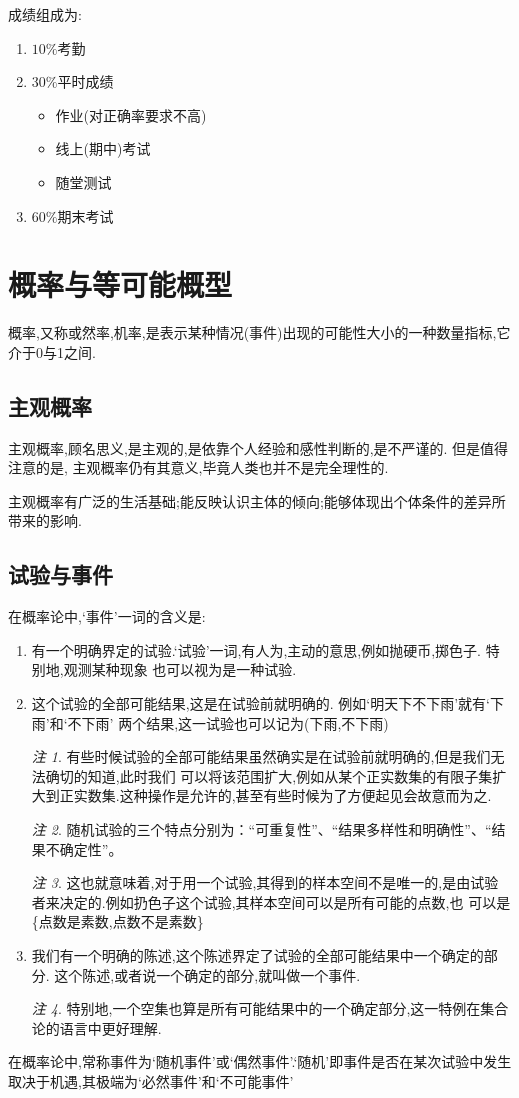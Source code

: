 \documentclass[a4paper,11pt]{article}%
\theoremstyle{remark}
\newtheorem*{remark}{注}
\theoremstyle{remark}
\theoremstyle{definition}
\theoremstyle{definition}
\theoremstyle{plain}
\begin{document}
\newpage
成绩组成为:
\begin{enumerate}
    \item$10\%$考勤
    \item$30\%$平时成绩 
    \begin{itemize}
        \item 作业(对正确率要求不高)
        \item 线上(期中)考试
        \item 随堂测试
    \end{itemize}
    \item$60\%$期末考试
\end{enumerate}
\newpage
\section{概率与等可能概型}
概率,又称或然率,机率,是表示某种情况(事件)出现的可能性大小的一种数量指标,它介于0与1之间.
\subsection{主观概率}
主观概率,顾名思义,是主观的,是依靠个人经验和感性判断的,是不严谨的. 但是值得注意的是,
主观概率仍有其意义,毕竟人类也并不是完全理性的.

主观概率有广泛的生活基础;能反映认识主体的倾向;能够体现出个体条件的差异所带来的影响.
\subsection{试验与事件}
在概率论中,`事件'一词的含义是:
\begin{enumerate}
    \item 有一个明确界定的试验.`试验'一词,有人为,主动的意思,例如抛硬币,掷色子. 特别地,观测某种现象
    也可以视为是一种试验.
    \item 这个试验的全部可能结果,这是在试验前就明确的. 例如`明天下不下雨'就有`下雨'和`不下雨'
    两个结果,这一试验也可以记为(下雨,不下雨)
    \begin{remark}
    有些时候试验的全部可能结果虽然确实是在试验前就明确的,但是我们无法确切的知道,此时我们
    可以将该范围扩大,例如从某个正实数集的有限子集扩大到正实数集.这种操作是允许的,甚至有些时候为了方便起见会故意而为之.
\end{remark}
\begin{remark}
    随机试验的三个特点分别为：“可重复性”、“结果多样性和明确性”、“结果不确定性”。
\end{remark}
\begin{remark}
    这也就意味着,对于用一个试验,其得到的样本空间不是唯一的,是由试验者来决定的.例如扔色子这个试验,其样本空间可以是所有可能的点数,也
    可以是\{点数是素数,点数不是素数\}
\end{remark}
    \item 我们有一个明确的陈述,这个陈述界定了试验的全部可能结果中一个确定的部分.
    这个陈述,或者说一个确定的部分,就叫做一个事件.
    \begin{remark}
        特别地,一个空集也算是所有可能结果中的一个确定部分,这一特例在集合论的语言中更好理解.
    \end{remark}
\end{enumerate}
在概率论中,常称事件为`随机事件'或`偶然事件'.`随机'即事件是否在某次试验中发生取决于机遇,其极端为`必然事件'和`不可能事件'
\end{document}
